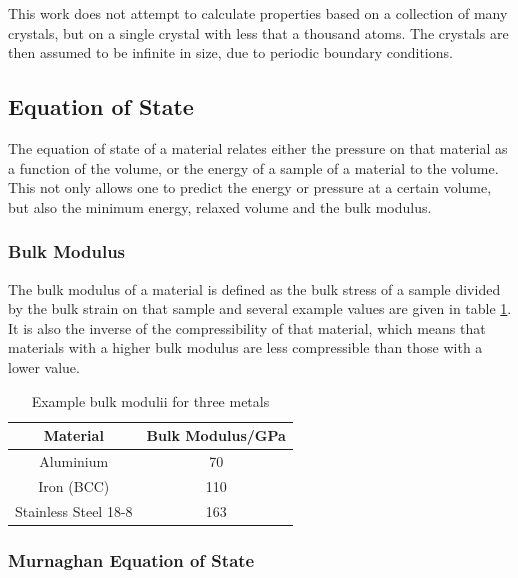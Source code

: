 This work does not attempt to calculate properties based on a collection of many crystals, but on a single crystal with less that a thousand atoms.  The crystals are then assumed to be infinite in size, due to periodic boundary conditions.



\subsection{Equation of State}

The equation of state of a material relates either the pressure on that material as a function of the volume, or the energy of a sample of a material to the volume.  This not only allows one to predict the energy or pressure at a certain volume, but also the minimum energy, relaxed volume and the bulk modulus.

\subsubsection{Bulk Modulus}

The bulk modulus of a material is defined as the bulk stress of a sample divided by the bulk strain on that sample and several example values are given in table \ref{table:examplebulkmodulii}.  It is also the inverse of the compressibility of that material, which means that materials with a higher bulk modulus are less compressible than those with a lower value.

\eqBulkModulusA

\eqBulkModulusB

\begin{table}[h]
\begin{center}
\renewcommand{\arraystretch}{1.2}
\begin{tabular}{c c}
\hline\hline
Material & Bulk Modulus/GPa \\
\hline\hline
Aluminium & 70 \\
Iron (BCC) & 110 \\
Stainless Steel 18-8 & 163 \\
\hline\hline
\end{tabular}
\end{center}
\caption{Example bulk modulii for three metals}
\label{table:examplebulkmodulii}
\end{table}

\subsubsection{Murnaghan Equation of State}

